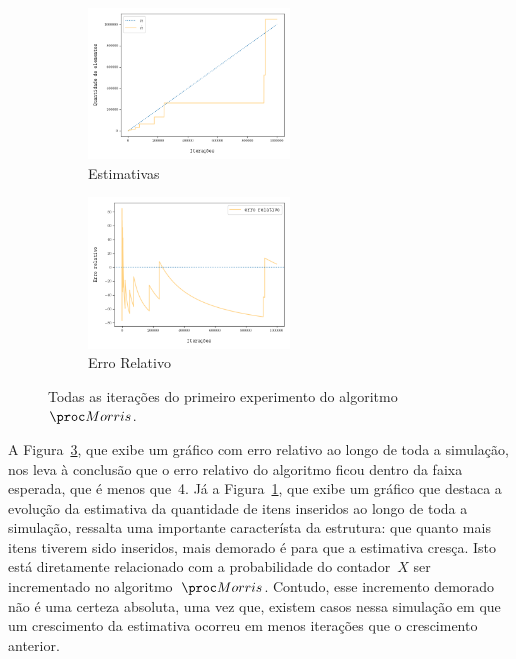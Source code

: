 \begin{figure}
  \centering
  \begin{subfigure}{.5\textwidth}
    \centering
    \captionsetup{justification=centering}
    \includegraphics[width=\linewidth, height=4cm]{figuras/morris_full.png}
    \caption{Estimativas}
    \label{fig:morris:1000000}
  \end{subfigure}%
  \begin{subfigure}{.5\textwidth}
    \centering
    \captionsetup{justification=centering}
    \includegraphics[width=\linewidth, height=4cm]{figuras/morris_erro_full.png}
	  \caption{Erro Relativo}
    \label{fig:morris:error:1000000}
  \end{subfigure}
  \caption{Todas as iterações do primeiro experimento do algoritmo~$\Morris$.}
\end{figure}

A Figura~\ref{fig:morris:error:1000000}, que exibe um gráfico com erro relativo ao longo de toda a simulação, nos leva
à conclusão que o erro relativo do algoritmo ficou dentro da faixa esperada, que é menos que~4. Já a 
Figura~\ref{fig:morris:1000000}, que exibe um gráfico que destaca a evolução da estimativa da quantidade de itens 
inseridos ao longo de toda a simulação, ressalta uma importante característa da estrutura: que quanto mais itens tiverem
sido inseridos, mais demorado é para que a estimativa cresça. Isto está diretamente relacionado com a probabilidade do 
contador~$X$ ser incrementado no algoritmo~$\Morris$. Contudo, esse incremento demorado não é uma certeza absoluta, uma
vez que, existem casos nessa simulação em que um crescimento da estimativa ocorreu em menos iterações que o 
crescimento anterior. 

